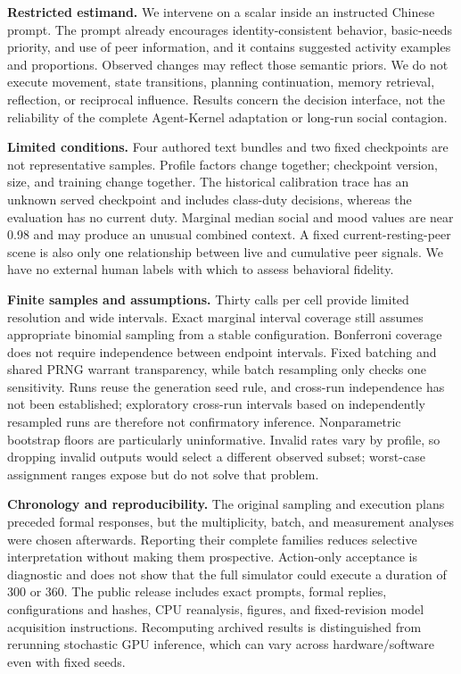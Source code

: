 \documentclass[conference]{IEEEtran}
\begin{document}
\textbf{Restricted estimand.} We intervene on a scalar inside an instructed Chinese prompt. The prompt already encourages identity-consistent behavior, basic-needs priority, and use of peer information, and it contains suggested activity examples and proportions. Observed changes may reflect those semantic priors. We do not execute movement, state transitions, planning continuation, memory retrieval, reflection, or reciprocal influence. Results concern the decision interface, not the reliability of the complete Agent-Kernel adaptation or long-run social contagion.

\textbf{Limited conditions.} Four authored text bundles and two fixed checkpoints are not representative samples. Profile factors change together; checkpoint version, size, and training change together. The historical calibration trace has an unknown served checkpoint and includes class-duty decisions, whereas the evaluation has no current duty. Marginal median social and mood values are near 0.98 and may produce an unusual combined context. A fixed current-resting-peer scene is also only one relationship between live and cumulative peer signals. We have no external human labels with which to assess behavioral fidelity.

\textbf{Finite samples and assumptions.} Thirty calls per cell provide limited resolution and wide intervals. Exact marginal interval coverage still assumes appropriate binomial sampling from a stable configuration. Bonferroni coverage does not require independence between endpoint intervals. Fixed batching and shared PRNG warrant transparency, while batch resampling only checks one sensitivity. Runs reuse the generation seed rule, and cross-run independence has not been established; exploratory cross-run intervals based on independently resampled runs are therefore not confirmatory inference. Nonparametric bootstrap floors are particularly uninformative. Invalid rates vary by profile, so dropping invalid outputs would select a different observed subset; worst-case assignment ranges expose but do not solve that problem.

\textbf{Chronology and reproducibility.} The original sampling and execution plans preceded formal responses, but the multiplicity, batch, and measurement analyses were chosen afterwards. Reporting their complete families reduces selective interpretation without making them prospective. Action-only acceptance is diagnostic and does not show that the full simulator could execute a duration of 300 or 360. The public release includes exact prompts, formal replies, configurations and hashes, CPU reanalysis, figures, and fixed-revision model acquisition instructions. Recomputing archived results is distinguished from rerunning stochastic GPU inference, which can vary across hardware/software even with fixed seeds.
\end{document}
